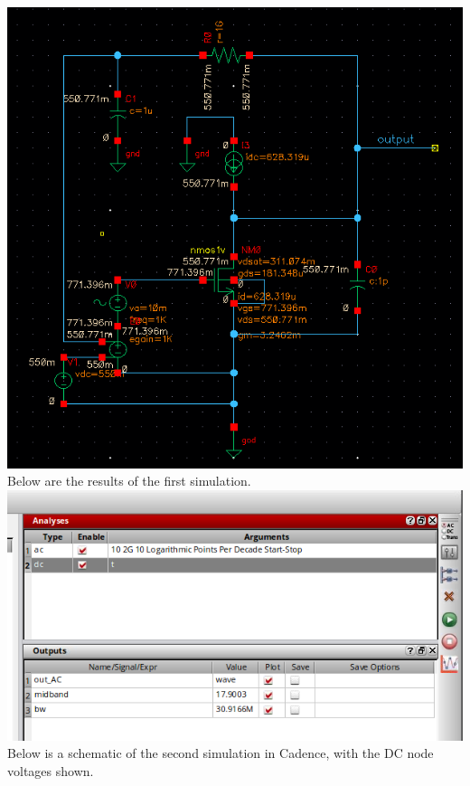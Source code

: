 \documentclass[12pt, fleqn]{article}
\begin{document}
\includegraphics[scale=0.5, center]{schem2.PNG}\\[0.25cm]
Below are the results of the first simulation.\\[0.25cm]
\includegraphics[scale=0.55, center]{sim_res2.PNG}\\[0.25cm]
\newpage
\noindent
Below is a schematic of the second simulation in Cadence, with the DC node voltages shown.\\[0.25cm]
\end{document}

